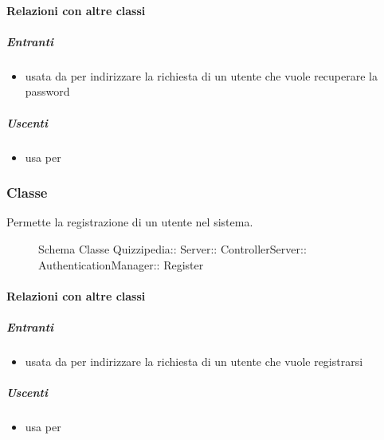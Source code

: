 \paragraph{Relazioni con altre classi}
\subparagraph{Entranti}
\begin{itemize}
\item usata da  per indirizzare la richiesta di un utente che vuole recuperare la password
\end{itemize}
\subparagraph{Uscenti}
\begin{itemize}
\item usa  per 
\end{itemize}
\subsubsection{Classe }
Permette la registrazione di un utente nel sistema.
\begin{figure}[H]
\centering
\noindent{}
\caption[Schema Classe Register]{Schema Classe Quizzipedia:: Server:: ControllerServer:: AuthenticationManager:: Register}
\end{figure}
\paragraph{Relazioni con altre classi}
\subparagraph{Entranti}
\begin{itemize}
\item usata da  per indirizzare la richiesta di un utente che vuole registrarsi
\end{itemize}
\subparagraph{Uscenti}
\begin{itemize}
\item usa  per 
\end{itemize}
